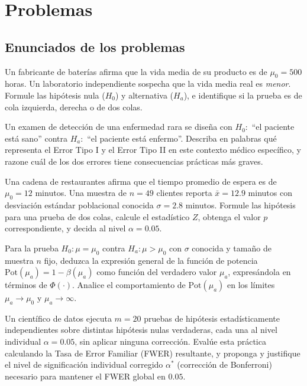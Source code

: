 \section*{Problemas}

\subsection*{Enunciados de los problemas}

\begin{problema}
	\label{prob:ddb67d0}
	Un fabricante de baterías afirma que la vida media de su producto es de $\mu_0=500$ horas. Un laboratorio independiente sospecha que la vida media real es \emph{menor}. Formule las hipótesis nula ($H_0$) y alternativa ($H_a$), e identifique si la prueba es de cola izquierda, derecha o de dos colas.
\end{problema}

\begin{problema}
	\label{prob:78013c6}
	Un examen de detección de una enfermedad rara se diseña con $H_0:$ ``el paciente está sano'' contra $H_a:$ ``el paciente está enfermo''. Describa en palabras qué representa el Error Tipo I y el Error Tipo II en este contexto médico específico, y razone cuál de los dos errores tiene consecuencias prácticas más graves.
\end{problema}

\begin{problema}
	\label{prob:74dc84f}
	Una cadena de restaurantes afirma que el tiempo promedio de espera es de $\mu_0=12$ minutos. Una muestra de $n=49$ clientes reporta $\bar x=12.9$ minutos con desviación estándar poblacional conocida $\sigma=2.8$ minutos. Formule las hipótesis para una prueba de dos colas, calcule el estadístico $Z$, obtenga el valor $p$ correspondiente, y decida al nivel $\alpha=0.05$.
\end{problema}

\begin{problema}
	\label{prob:fad6841}
	Para la prueba $H_0:\mu=\mu_0$ contra $H_a:\mu>\mu_0$ con $\sigma$ conocida y tamaño de muestra $n$ fijo, deduzca la expresión general de la función de potencia $\text{Pot}(\mu_a)=1-\beta(\mu_a)$ como función del verdadero valor $\mu_a$, expresándola en términos de $\Phi(\cdot)$. Analice el comportamiento de $\text{Pot}(\mu_a)$ en los límites $\mu_a\to\mu_0$ y $\mu_a\to\infty$.
\end{problema}

\begin{problema}
	\label{prob:66368eb}
	Un científico de datos ejecuta $m=20$ pruebas de hipótesis estadísticamente independientes sobre distintas hipótesis nulas verdaderas, cada una al nivel individual $\alpha=0.05$, sin aplicar ninguna corrección. Evalúe esta práctica calculando la Tasa de Error Familiar (FWER) resultante, y proponga y justifique el nivel de significación individual corregido $\alpha^*$ (corrección de Bonferroni) necesario para mantener el FWER global en $0.05$.
\end{problema}

